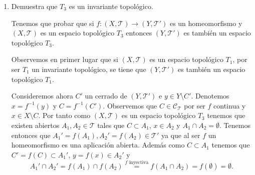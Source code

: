 \documentclass[12pt]{article}
\begin{document}
\begin{ejercicio}
\begin{enumerate}[label=\alph*)]
            \item Demuestra que $T_3$ es un invariante topológico.
            
                Tenemos que probar que si $f:(X,\mathcal{T})\rightarrow(Y,\mathcal{T}')$ es un homeomorfismo y $(X,\mathcal{T})$ es un espacio topológico $T_3$ entonces $(Y,\mathcal{T}')$ es también un espacio topológico $T_3$.
    
                Observemos en primer lugar que si $(X,\mathcal{T})$ es un espacio topológico $T_1$, por ser $T_1$ un invariante topológico, se tiene que $(Y,\mathcal{T}')$ es también un espacio topológico $T_1$.
        
                Consideremos ahora $C'$ un cerrado de $(Y,\mathcal{T}')$ e $y\in Y\setminus C'$. Denotemos $x=f^{-1}(y)$ y $C=f^{-1}(C')$. Observemos que $C\in\mathcal{C}_{\mathcal{T}}$ por ser $f$ continua y $x\in X\setminus C$. Por tanto como $(X,\mathcal{T})$ es un espacio topológico $T_3$ tenemos que existen abiertos $A_1, A_2\in\mathcal{T}$ tales que $C\subset A_1$, $x\in A_2$ y $A_1\cap A_2=\emptyset$. Tenemos entonces que $A_1'=f(A_1), A_2'=f(A_2)\in\mathcal{T}'$ ya que al ser $f$ un homeomorfismo es una aplicación abierta. Además como $C\subset A_1$ tenemos que $C'=f(C)\subset A_1'$, $y=f(x)\in A_2'$ y
                \[
                A_1'\cap A_2'=f(A_1)\cap f(A_2) \overset{f\text{ inyectiva}}{=} f(A_1\cap A_2) = f(\emptyset) = \emptyset.
                \]
        \end{enumerate}
    \end{ejercicio}
\end{document}

